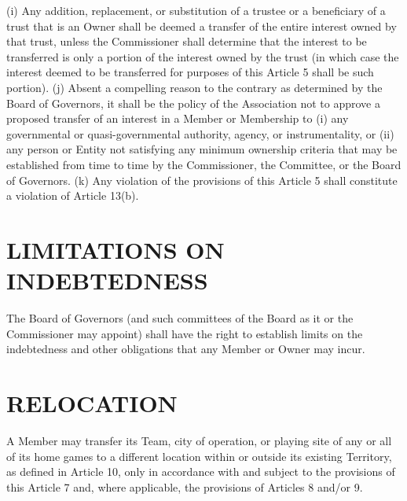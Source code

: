 \documentclass[]{book}
\begin{document}
(i) Any addition, replacement, or substitution of a trustee or a beneficiary of a trust that is an Owner shall be deemed a transfer of the entire interest owned by that trust, unless the Commissioner shall determine that the interest to be transferred is only a portion of the interest owned by the trust (in which case the interest deemed to be transferred for purposes of this Article 5 shall be such portion).
(j) Absent a compelling reason to the contrary as determined by the Board of Governors, it shall be the policy of the Association not to approve a proposed transfer of an interest in a Member or Membership to (i) any governmental or quasi-governmental authority, agency, or instrumentality, or (ii) any person or Entity not satisfying any minimum ownership criteria that may be established from time to time by the Commissioner, the Committee, or the Board of Governors.
(k) Any violation of the provisions of this Article 5 shall constitute a violation of Article 13(b).

\hypertarget{limitations-on-indebtedness}{%
\section{LIMITATIONS ON INDEBTEDNESS}\label{limitations-on-indebtedness}}

The Board of Governors (and such committees of the Board as it or the Commissioner may appoint) shall have the right to establish limits on the indebtedness and other obligations that any Member or Owner may incur.

\hypertarget{relocation}{%
\section{RELOCATION}\label{relocation}}

A Member may transfer its Team, city of operation, or playing site of any or all of its home games to a different location within or outside its existing Territory, as defined in Article 10, only in accordance with and subject to the provisions of this Article 7 and, where applicable, the provisions of Articles 8 and/or 9.
\end{document}
